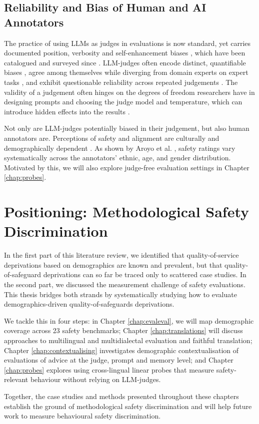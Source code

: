 \subsection{Reliability and Bias of Human and AI Annotators}


The practice of using LLMs as judges in evaluations is now standard, yet carries documented position, verbosity and self-enhancement biases \cite{NEURIPS2023_91f18a12}, which have been catalogued and surveyed since \cite{gu2025surveyllmasajudge}. LLM-judges often encode distinct, quantifiable biases \cite{ye2025justice}, agree among themselves while diverging from domain experts on expert tasks \cite{limitations_llm_judge}, and exhibit questionable reliability across repeated judgements \cite{schroeder2025trustllmjudgmentsreliability}. The validity of a judgement often hinges on the degrees of freedom researchers have in designing prompts and choosing the judge model and temperature, which can introduce hidden effects into the results \cite{baumann2025largelanguagemodelhacking}.

Not only are LLM-judges potentially biased in their judgement, but also human annotators are. Perceptions of safety and alignment  are culturally and demographically dependent \cite{kirk2024prism}. As shown by Aroyo et al. \cite{aroyo2023dices}, safety ratings vary systematically across the annotators' ethnic, age, and gender distribution. Motivated by this, we will also explore judge-free evaluation settings in Chapter \ref{chap:probes}.




\section{Positioning: Methodological Safety Discrimination}

In the first part of this literature review, we identified that quality-of-service deprivations based on demographics are known and prevalent, but that quality-of-safeguard deprivations can so far be traced only to scattered case studies. In the second part, we discussed the measurement challenge of safety evaluations. This thesis bridges both strands by systematically studying how to evaluate demographics-driven quality-of-safeguards deprivations.

We tackle this in four steps: in Chapter \ref{chap:evaleval}, we will map demographic coverage across 23 safety benchmarks; Chapter \ref{chap:translations} will discuss approaches to multilingual and multidialectal evaluation and faithful translation; Chapter \ref{chap:contextualising} investigates demographic contextualisation of evaluations of advice at the judge, prompt and memory level; and Chapter \ref{chap:probes} explores using cross-lingual linear probes that measure safety-relevant behaviour without relying on LLM-judges.

Together, the case studies and methods presented throughout these chapters establish the ground of methodological safety discrimination and will help future work to measure behavioural safety discrimination.
